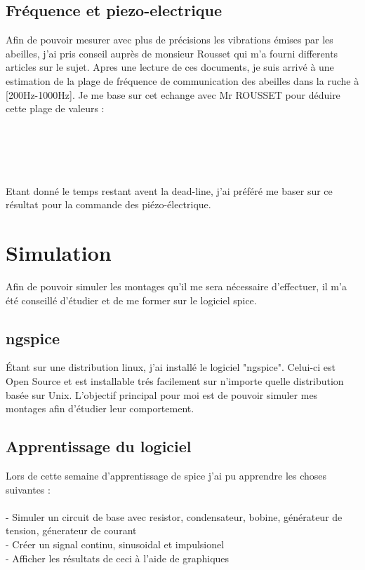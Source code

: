 \documentclass[11pt,french,a4paper]{article}
\begin{document}
\subsection{Fréquence et piezo-electrique}
Afin de pouvoir mesurer avec plus de précisions les vibrations émises par les abeilles, j'ai pris conseil auprès de monsieur Rousset qui m'a fourni differents articles sur le sujet.
Apres une lecture de ces documents, je suis arrivé à une estimation de la plage de fréquence de communication des abeilles dans la ruche à [200Hz-1000Hz]. Je me base sur cet echange avec Mr ROUSSET pour déduire cette plage de valeurs : \\ 
\\
\\
\\ \\ \\Etant donné le temps restant avent la dead-line, j'ai préféré me baser sur ce résultat pour la commande des piézo-électrique.

\newpage
\section{Simulation}
Afin de pouvoir simuler les montages qu'il me sera nécessaire d'effectuer, il m'a été conseillé d'étudier et de me former sur le logiciel spice.

\subsection{ngspice}
Étant sur une distribution linux, j'ai installé le logiciel "ngspice". Celui-ci est Open Source et est installable trés facilement sur n'importe quelle distribution basée sur Unix. L'objectif principal pour moi est de pouvoir simuler mes montages afin d'étudier leur comportement. 

\subsection{Apprentissage du logiciel}
Lors de cette semaine d'apprentissage de spice j'ai pu apprendre les choses suivantes :
\\
\\
- Simuler un circuit de base avec resistor, condensateur, bobine, générateur de tension, génerateur de courant\\
- Créer un signal continu, sinusoidal et impulsionel \\
- Afficher les résultats de ceci à l'aide de graphiques \\
\end{document}

